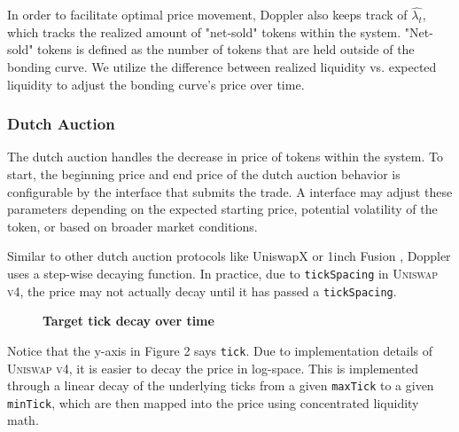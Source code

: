 \documentclass[sigconf,nonacm,prologue,table]{acmart}
\numberwithin{equation}{section}
\theoremstyle{definition}
\theoremstyle{remark}
\begin{document}
In order to facilitate optimal price movement, Doppler also keeps track of $\hat{\lambda_t}$, which tracks the realized amount of "net-sold" tokens within the system. "Net-sold" tokens is defined as the number of tokens that are held outside of the bonding curve. We utilize the difference between realized liquidity vs. expected liquidity to adjust the bonding curve's price over time. 

\subsubsection{Dutch Auction}

The dutch auction handles the decrease in price of tokens within the system. To start, the beginning price and end price of the dutch auction behavior is configurable by the interface that submits the trade. A interface may adjust these parameters depending on the expected starting price, potential volatility of the token, or based on broader market conditions. 

Similar to other dutch auction protocols like UniswapX \cite{adamsuniswapx} or 1inch Fusion \cite{1inchfusion}, Doppler uses a step-wise decaying function. In practice, due to \verb|tickSpacing| in \textsc{Uniswap v4}, the price may not actually decay until it has passed a \verb|tickSpacing|. 

\begin{figure}[htb]
    \label{fig:tick_decay}
    \centering
    \caption{\textbf{Target tick decay over time}} 
\end{figure}

Notice that the y-axis in Figure 2 says \verb|tick|. Due to implementation details of \textsc{Uniswap v4}, it is easier to decay the price in log-space. This is implemented through a linear decay of the underlying ticks from a given \verb|maxTick| to a given \verb|minTick|, which are then mapped into the price using concentrated liquidity math. 
\end{document}
